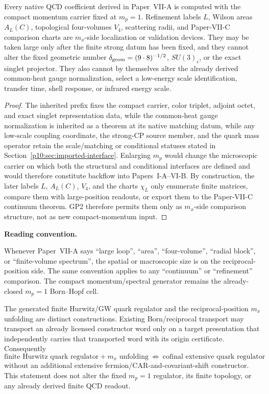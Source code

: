 \documentclass[12pt,a4paper]{article}
\providecommand{\deltageom}{\delta_{\rm geom}}
\begin{document}
\begin{theorem}
\label{p10:thm:no-mp-flow-paper-x}
Every native QCD coefficient derived in Paper~VII-A is computed with the compact momentum carrier fixed at \(m_p=1\).  Refinement labels \(L\), Wilson areas \(A_L(C)\), topological four-volumes \(V_4\), scattering radii, and Paper-VII-C comparison charts are \(m_x\)-side localization or validation devices.  They may be taken large only after the finite strong datum has been fixed, and they cannot alter the fixed geometric number \(\deltageom=(9\cdot8)^{-1/2}\), \(SU(3)_c\), or the exact singlet projector.  They also cannot by themselves alter the already derived common-heat gauge normalization, select a low-energy scale identification, transfer time, shell response, or infrared energy scale.
\end{theorem}
\begin{proof}
The inherited prefix fixes the compact carrier, color triplet, adjoint octet, and exact singlet representation data, while the common-heat gauge normalization is inherited as a theorem at its native matching datum, while any low-scale coupling coordinate, the strong-CP source member, and the quark mass operator retain the scale/matching or conditional statuses stated in Section~\ref{p10:sec:imported-interface}.  Enlarging \(m_p\) would change the microscopic carrier on which both the structural and conditional interfaces are defined and would therefore constitute backflow into Papers~I-A--VI-B.  By construction, the later labels \(L\), \(A_L(C)\), \(V_4\), and the charts \(\chi_L\) only enumerate finite matrices, compare them with large-position readouts, or export them to the Paper-VII-C continuum theorem.  GP2 therefore permits them only as \(m_x\)-side comparison structure, not as new compact-momentum input.
\end{proof}

\textbf{Reading convention.}\par\smallskip
Whenever Paper~VII-A says ``large loop'', ``area'', ``four-volume'',
``radial block'', or ``finite-volume spectrum'', the spatial or macroscopic
size is on the reciprocal-position side.  The same convention applies to any
``continuum'' or ``refinement'' comparison.  The compact momentum/spectral
generator remains the already-closed \(m_p=1\) Born--Hopf cell.

\begin{corollary}
\label{p10:cor:v2180-mx-unfolding-no-quark-constructor}
The generated finite Hurwitz/GW quark regulator and the reciprocal-position
$m_x$ unfolding are distinct constructions.  Existing Born/reciprocal
transport may transport an already licensed constructor word only on a target
presentation that independently carries that transported word with its origin
certificate.  Consequently
\[
 \boxed{\text{finite Hurwitz quark regulator}+m_x\text{ unfolding}
 \ \not\Rightarrow\ \text{cofinal extensive quark regulator}}
\]
without an additional extensive fermion/CAR-and-covariant-shift constructor.
This statement does not alter the fixed $m_p=1$ regulator, its finite topology,
or any already derived finite QCD readout.
\end{corollary}
\end{document}
